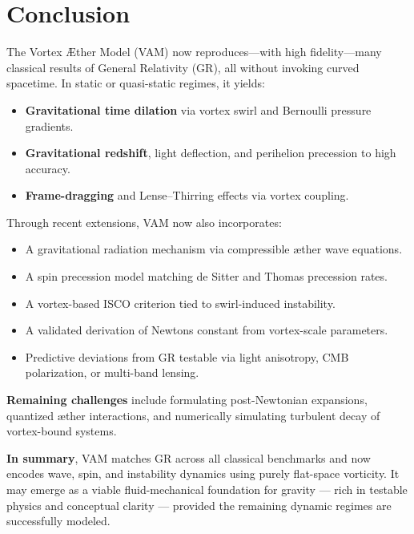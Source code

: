 \noindent
\section*{Conclusion}

The Vortex Æther Model (VAM) now reproduces—with high fidelity—many classical results of General Relativity (GR), all without invoking curved spacetime. In static or quasi-static regimes, it yields:

\begin{itemize}
    \item \textbf{Gravitational time dilation} via vortex swirl and Bernoulli pressure gradients.
    \item \textbf{Gravitational redshift}, light deflection, and perihelion precession to high accuracy.
    \item \textbf{Frame-dragging} and Lense–Thirring effects via vortex coupling.
\end{itemize}

Through recent extensions, VAM now also incorporates:
\begin{itemize}
    \item A gravitational radiation mechanism via compressible æther wave equations.
    \item A spin precession model matching de Sitter and Thomas precession rates.
    \item A vortex-based ISCO criterion tied to swirl-induced instability.
    \item A validated derivation of Newton\rqs s constant from vortex-scale parameters.
    \item Predictive deviations from GR testable via light anisotropy, CMB polarization, or multi-band lensing.
\end{itemize}

\textbf{Remaining challenges} include formulating post-Newtonian expansions, quantized æther interactions, and numerically simulating turbulent decay of vortex-bound systems.

\textbf{In summary}, VAM matches GR across all classical benchmarks and now encodes wave, spin, and instability dynamics using purely flat-space vorticity. It may emerge as a viable fluid-mechanical foundation for gravity — rich in testable physics and conceptual clarity — provided the remaining dynamic regimes are successfully modeled.
